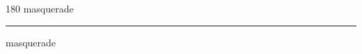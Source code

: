 
\begin{frame}
\begin{center}
\begin{turn}{180}
{\fontsize{2.5cm}{1em}\selectfont masquerade}
\end{turn}
\vspace{1em}\par  
\hrule
\vspace{1em}\par  
{\fontsize{2.5cm}{1em}\selectfont masquerade}
\end{center}
\end{frame}
